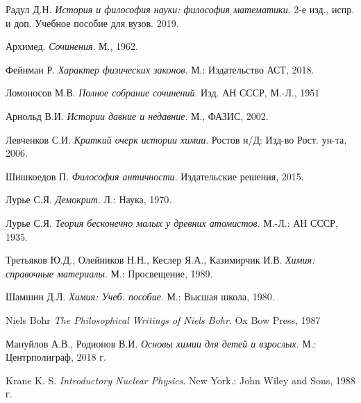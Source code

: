 \begin{thebibliography}{9}

Радул Д.Н. 
\textit{История и философия науки: философия математики}. 2-е изд., испр. и доп. Учебное пособие для вузов. 2019.

Архимед.
\textit{Сочинения}. М., 1962.

Фейнман Р.
\textit{Характер физических законов}. М.: Издательство АСТ, 2018.

Ломоносов М.В.
\textit{Полное собрание сочинений}. Изд. АН СССР, М.-Л., 1951

Арнольд В.И.
\textit{Истории давние и недавние}. М., ФАЗИС, 2002.

Левченков С.И.
\textit{Краткий очерк истории химии}. Ростов н/Д: Изд-во Рост. ун-та, 2006.

Шишкоедов П.
\textit{Философия античности}. Издательские решения, 2015.

Лурье С.Я.
\textit{Демокрит}. Л.: Наука, 1970.

Лурье С.Я.
\textit{Теория бесконечно малых у древних атомистов}.  М.-Л.: АН СССР, 1935.

Третьяков Ю.Д., Олейников Н.Н., Кеслер Я.А., Казимирчик И.В.
\textit{Химия: справочные материалы}. М.: Просвещение, 1989.

Шамшин Д.Л.
\textit{Химия: Учеб. пособие}. М.: Высшая школа, 1980.

Niels Bohr
\textit{The Philosophical Writings of Niels Bohr}. Ox Bow Press, 1987

Мануйлов А.В., Родионов В.И.
\textit{Основы химии для детей и взрослых}. М.: Центрполиграф, 2018 г.

Krane K. S. 
\textit{Introductory Nuclear Physics}. New York.: John Wiley and Sons, 1988 г.





\end{thebibliography}
